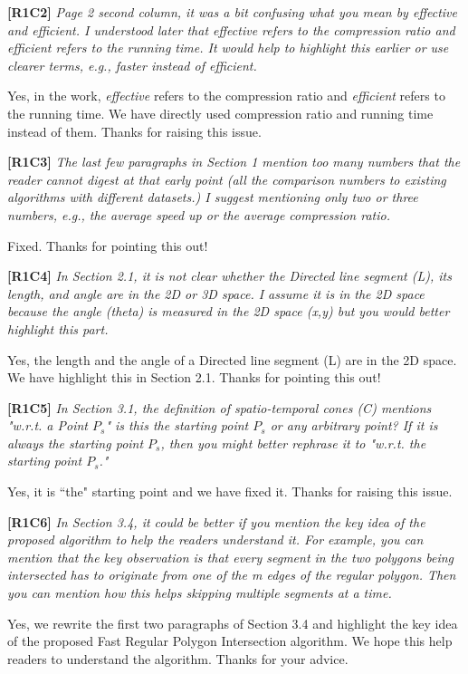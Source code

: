 \documentclass{letter}
\begin{document}
\textbf{[R1C2]} \emph{Page 2 second column, it was a bit confusing what you mean by effective and efficient. I understood later that effective refers to the compression ratio and efficient refers to the running time. It would help to highlight this earlier or use clearer terms, e.g., faster instead of efficient.}

Yes, in the work, \emph{effective} refers to the compression ratio and \emph{efficient} refers to the running time. We have directly used compression ratio and running time instead of them. Thanks for raising this issue.

\textbf{[R1C3]} \emph{The last few paragraphs in Section 1 mention too many numbers that the reader cannot digest at that early point (all the comparison numbers to existing algorithms with different datasets.) I suggest mentioning only two or three numbers, e.g., the average speed up or the average compression ratio.}

Fixed. Thanks for pointing this out!

\textbf{[R1C4]} \emph{In Section 2.1, it is not clear whether the Directed line segment (L), its length, and angle are in the 2D or 3D space. I assume it is in the 2D space because the angle (theta) is measured in the 2D space (x,y) but you would better highlight this part.}

Yes, the length and the angle of a Directed line segment (L) are in the 2D space. We have highlight this in Section 2.1. Thanks for pointing this out!

\textbf{[R1C5]} \emph{In Section 3.1, the definition of spatio-temporal cones (C) mentions "w.r.t. a Point $P_s$" is this the starting point $P_s$ or any arbitrary point? If it is always the starting point $P_s$, then you might better rephrase it to "w.r.t. the starting point $P_s$."}

Yes, it is ``the" starting point and we have fixed it. Thanks for raising this issue.

\textbf{[R1C6]} \emph{In Section 3.4, it could be better if you mention the key idea of the proposed algorithm to help the readers understand it. For example, you can mention that the key observation is that every segment in the two polygons being intersected has to originate from one of the m edges of the regular polygon. Then you can mention how this helps skipping multiple segments at a time.}

Yes, we rewrite the first two paragraphs of Section 3.4 and highlight the key idea of the proposed Fast Regular Polygon Intersection algorithm. We hope this help readers to understand the algorithm. 
Thanks for your advice.
\end{document}
